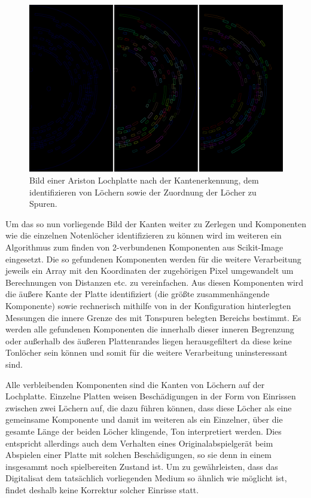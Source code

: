 \begin{figure}[t]
    \centering
    \includegraphics[width=\textwidth]{graphics/processing.png}
    \caption{Bild einer Ariston Lochplatte nach der Kantenerkennung, dem identifizieren von Löchern sowie der Zuordnung der Löcher zu Spuren.}
    \label{pipelinesteps}
\end{figure}

Um das so nun vorliegende Bild der Kanten weiter zu Zerlegen und Komponenten wie die einzelnen Notenlöcher identifizieren zu können wird im weiteren ein Algorithmus zum finden von 2-verbundenen Komponenten aus Scikit-Image \parencite[]{scikit-image} eingesetzt.
Die so gefundenen Komponenten werden für die weitere Verarbeitung jeweils ein Array mit den Koordinaten der zugehörigen Pixel umgewandelt um Berechnungen von Distanzen etc. zu vereinfachen.
Aus diesen Komponenten wird die äußere Kante der Platte identifiziert (die größte zusammenhängende Komponente) sowie rechnerisch mithilfe von in der Konfiguration hinterlegten Messungen die innere Grenze des mit Tonspuren belegten Bereichs bestimmt.
Es werden alle gefundenen Komponenten die innerhalb dieser inneren Begrenzung oder außerhalb des äußeren Plattenrandes liegen herausgefiltert da diese keine Tonlöcher sein können und somit für die weitere Verarbeitung uninsteressant sind.

Alle verbleibenden Komponenten sind die Kanten von Löchern auf der Lochplatte.
Einzelne Platten weisen Beschädigungen in der Form von Einrissen zwischen zwei Löchern auf, die dazu führen können, dass diese Löcher als eine gemeinsame Komponente und damit im weiteren als ein Einzelner, über die gesamte Länge der beiden Löcher klingende, Ton interpretiert werden.
Dies entspricht allerdings auch dem Verhalten eines Originalabspielgerät beim Abspielen einer Platte mit solchen Beschädigungen, so sie denn in einem insgesammt noch spielbereiten Zustand ist.
Um zu gewährleisten, dass das Digitalisat dem tatsächlich vorliegenden Medium so ähnlich wie möglicht ist, findet deshalb keine Korrektur solcher Einrisse statt.

